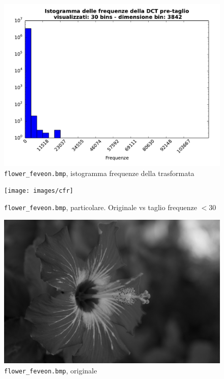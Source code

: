 \documentclass[11pt,a4paper]{scrartcl}
\begin{document}
\begin{figure}[!ht]
\centering
\includegraphics[scale=0.55]{images/hist_fiore_30_pre} 
\caption{\texttt{flower\_feveon.bmp}, istogramma frequenze della trasformata}
\end{figure}

\begin{figure}[!ht]
\centering
\texttt{[image: images/cfr]} 
\caption{\texttt{flower\_feveon.bmp}, particolare. Originale vs taglio frequenze $< 30$}
\end{figure}

\begin{figure}[!ht]
\centering
\includegraphics[scale=0.29]{images/flower_foveon} 
\caption{\texttt{flower\_feveon.bmp}, originale}
\end{figure}
\end{document}
